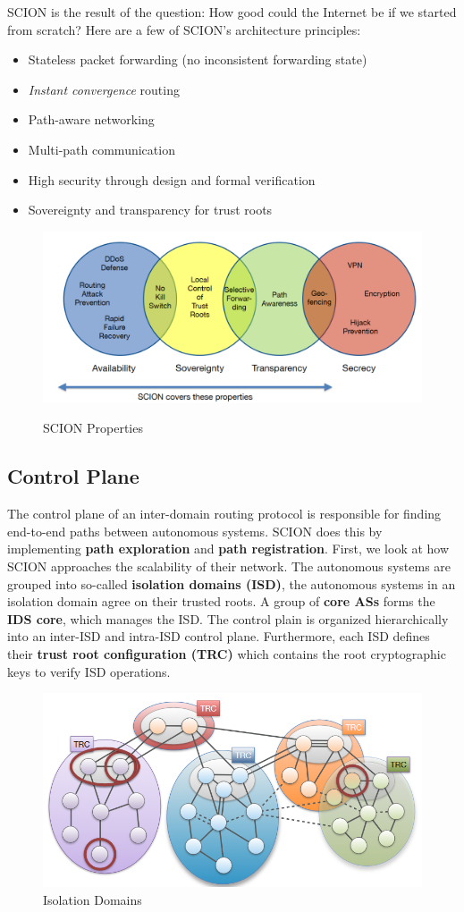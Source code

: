 SCION is the result of the question: How good could the Internet be if we started from scratch? Here are a few of SCION's architecture principles:
\begin{itemize}
\item Stateless packet forwarding (no inconsistent forwarding state)
\item \textit{Instant convergence} routing
\item Path-aware networking
\item Multi-path communication
\item High security through design and formal verification
\item Sovereignty and transparency for trust roots
\end{itemize}
\begin{figure}[H]
\centering
\includegraphics[width=.7\textwidth]{images/scion_properties.PNG}
\label{scion_properties}
\caption{SCION Properties}
\end{figure}

\subsection{Control Plane}
The control plane of an inter-domain routing protocol is responsible for finding end-to-end paths between autonomous systems. SCION does this by implementing \textbf{path exploration} and \textbf{path registration}. First, we look at how SCION approaches the scalability of their network. The autonomous systems are grouped into so-called \textbf{isolation domains (ISD)}, the autonomous systems in an isolation domain agree on their trusted roots. A group of \textbf{core ASs} forms the \textbf{IDS core}, which manages the ISD. The control plain is organized hierarchically into an inter-ISD and intra-ISD control plane. Furthermore, each ISD defines their \textbf{trust root configuration (TRC)} which contains the root cryptographic keys to verify ISD operations. 
\begin{figure}[H]
\centering
\includegraphics[width=.6\textwidth]{images/control_plane.PNG}
\caption{Isolation Domains}
\label{control_plane}
\end{figure}

